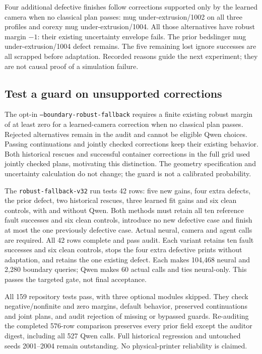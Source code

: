 \documentclass[10pt,letterpaper]{article}
\begin{document}
Four additional defective finishes follow corrections supported only by the
learned camera when no classical plan passes: mug under-extrusion/1002 on all
three profiles and corexy mug under-extrusion/1004. All those alternatives have
robust margin $-1$: their existing uncertainty envelope fails. The prior
bedslinger mug under-extrusion/1004 defect remains. The five remaining lost
ignore successes are all scrapped before adaptation. Recorded reasons guide
the next experiment; they are not causal proof of a simulation failure.

\subsection*{Test a guard on unsupported corrections}
The opt-in \texttt{--boundary-robust-fallback} requires a finite existing robust
margin of at least zero for a learned-camera correction when no classical plan
passes. Rejected alternatives remain in the audit and cannot be eligible Qwen
choices. Passing continuations and jointly checked corrections keep their
existing behavior. Both historical rescues and successful container corrections
in the full grid used jointly checked plans, motivating this distinction.
The geometry specification and uncertainty calculation do not change; the
guard is not a calibrated probability.

The \texttt{robust-fallback-v32} run tests 42 rows: five new gains, four extra
defects, the prior defect, two historical rescues, three learned fit gains and
six clean controls, with and without Qwen. Both methods must retain all ten
reference fault successes and six clean controls, introduce no new defective
case and finish at most the one previously defective case. Actual neural,
camera and agent calls are required. All 42 rows complete and pass audit. Each
variant retains ten fault successes and six clean controls, stops the four extra
defective prints without adaptation, and retains the one existing defect.
Each makes 104,468 neural and 2,280 boundary queries; Qwen makes 60 actual calls
and ties neural-only. This passes the targeted gate, not final acceptance.

All 159 repository tests pass, with three optional modules skipped. They check
negative/nonfinite and zero margins, default behavior, preserved continuations
and joint plans, and audit rejection of missing or bypassed guards. Re-auditing
the completed 576-row comparison preserves every prior field except the auditor
digest, including all 527 Qwen calls. Full historical regression and untouched
seeds 2001--2004 remain outstanding. No physical-printer reliability is claimed.
\end{document}
